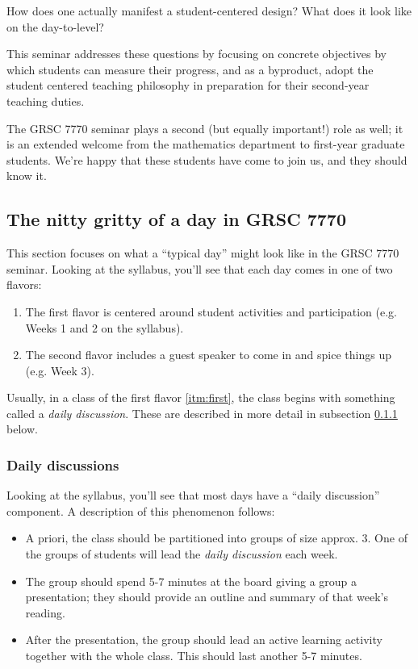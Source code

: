 \begin{question}
  How does one actually manifest a student-centered design?  What does it look like on the day-to-level?
\end{question}
\noindent
This seminar addresses these questions by focusing on concrete objectives by which students can measure their progress, and as a byproduct, adopt the student centered teaching philosophy in preparation for their second-year teaching duties.


The GRSC 7770 seminar plays a second (but equally important!) role as well; it is an extended welcome from the mathematics department to first-year graduate students.  We're happy that these students have come to join us, and they should know it.



\subsection{The nitty gritty of a day in GRSC 7770}
\label{sec:nitty-gritty-day}

This section focuses on what a ``typical day'' might look like in the GRSC 7770 seminar.  Looking at the syllabus, you'll see that each day comes in one of two flavors:
\begin{enumerate}
\item \label{itm:first} The first flavor is centered around student activities and participation (e.g. Weeks 1 and 2 on the syllabus).
\item \label{itm:second} The second flavor includes a guest speaker to come in and spice things up (e.g. Week 3).
\end{enumerate}

Usually, in a class of the first flavor \eqref{itm:first}, the class begins with something called a \emph{daily discussion}.  These are described in more detail in subsection \ref{sec:daily-discussions} below.  

\subsubsection{Daily discussions}
\label{sec:daily-discussions}

Looking at the syllabus, you'll see that most days have a ``daily discussion'' component.  A description of this phenomenon follows:

\begin{itemize}
\item A priori, the class should be partitioned into groups of size approx. 3.  One of the groups of students will lead the \emph{daily discussion} each week.
\item The group should spend 5-7 minutes at the board giving a group a presentation; they should provide an outline and summary of that week's reading.  
\item After the presentation, the group should lead an active learning activity together with the whole class.  This should last another 5-7 minutes.  
\end{itemize}

